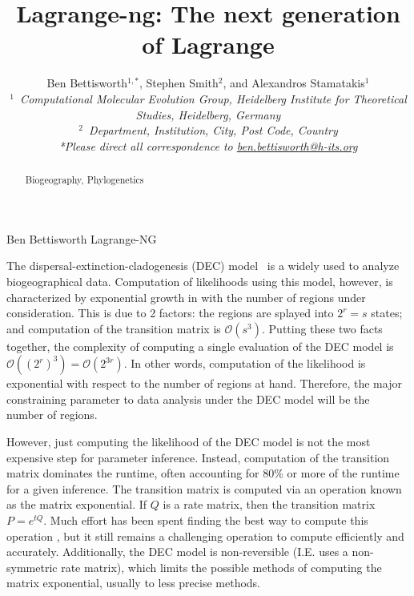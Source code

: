 \documentclass[oupdraft]{sysbio}
\begin{document}
\title{Lagrange-ng: The next generation of Lagrange}

\author{Ben Bettisworth$^{1,\ast}$, Stephen Smith$^{2}$, and
  Alexandros Stamatakis$^{1}$\\[4pt]
  \textit{$^{1}$~Computational Molecular Evolution Group, Heidelberg Institute for Theoretical Studies, Heidelberg,
    Germany}
  \\
  \textit{$^{2}$~Department, Institution, City, Post Code, Country}
  \\[2pt]
  \textit{*Please direct all correspondence to \url{ben.bettisworth@h-its.org}}}

\markboth%
{Ben Bettisworth}
{Lagrange-NG}

\maketitle

\begin{abstract}
  {}
  {Biogeography, Phylogenetics}
\end{abstract}
\newline

The dispersal-extinction-cladogenesis (DEC) model~\citep{ree_likelihood_2005} is a widely used to analyze biogeographical
data. Computation of likelihoods using this model, however, is characterized by exponential growth in with the number of
regions under consideration. This is due to 2 factors: the regions are splayed into $2^r = s$ states; and computation of
the transition matrix is $\mathcal{O}(s^3)$. Putting these two facts together, the complexity of computing a single
evaluation of the DEC model is $\mathcal{O}((2^r)^3) = \mathcal{O}(2^{3r})$. In other words, computation of the
likelihood is exponential with respect to the number of regions at hand. Therefore, the major constraining parameter to
data analysis under the DEC model will be the number of regions.

However, just computing the likelihood of the DEC model is not the most expensive step for parameter inference. Instead,
computation of the transition matrix dominates the runtime, often accounting for 80\% or more of the runtime for a given
inference.  The transition matrix is computed via an operation known as the matrix exponential. If $Q$ is a rate matrix,
then the transition matrix $P = e^{tQ}$. Much effort has been spent finding the best way to compute this operation
\citep{moler_nineteen_2003}, but it still remains a challenging operation to compute efficiently and accurately.
Additionally, the DEC model is non-reversible (I.E. uses a non-symmetric rate matrix), which limits the possible methods
of computing the matrix exponential, usually to less precise methods.
\end{document}

